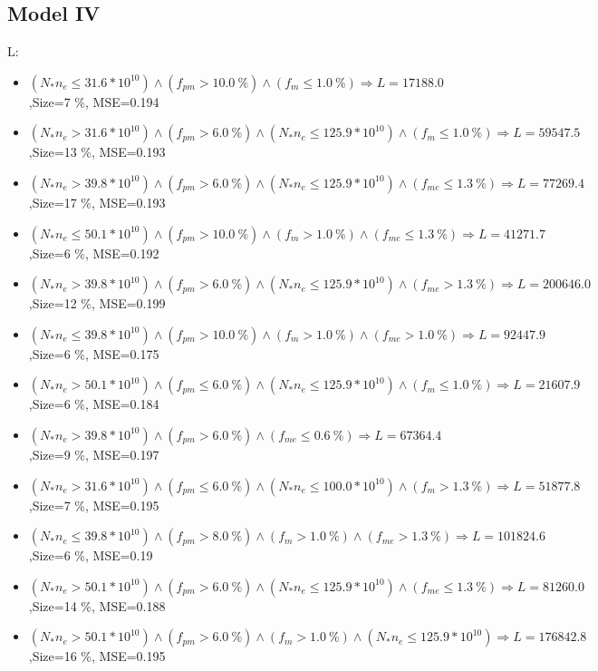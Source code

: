 \documentclass[numbered]{CSL}
\begin{document}
\subsection{Model IV}
L:
\begin{itemize}
\item $(N_* n_e \leq 31.6 * 10^{10}) \land (f_{pm} > 10.0~\%) \land (f_m \leq 1.0~\%) \Rightarrow L = 17188.0$,\hfill Size=7 \%, MSE=0.194
\item $(N_* n_e > 31.6 * 10^{10}) \land (f_{pm} > 6.0~\%) \land (N_* n_e \leq 125.9 * 10^{10}) \land (f_m \leq 1.0~\%) \Rightarrow L = 59547.5$,\hfill Size=13 \%, MSE=0.193
\item $(N_* n_e > 39.8 * 10^{10}) \land (f_{pm} > 6.0~\%) \land (N_* n_e \leq 125.9 * 10^{10}) \land (f_{me} \leq 1.3~\%) \Rightarrow L = 77269.4$,\hfill Size=17 \%, MSE=0.193
\item $(N_* n_e \leq 50.1 * 10^{10}) \land (f_{pm} > 10.0~\%) \land (f_m > 1.0~\%) \land (f_{me} \leq 1.3~\%) \Rightarrow L = 41271.7$,\hfill Size=6 \%, MSE=0.192
\item $(N_* n_e > 39.8 * 10^{10}) \land (f_{pm} > 6.0~\%) \land (N_* n_e \leq 125.9 * 10^{10}) \land (f_{me} > 1.3~\%) \Rightarrow L = 200646.0$,\hfill Size=12 \%, MSE=0.199
\item $(N_* n_e \leq 39.8 * 10^{10}) \land (f_{pm} > 10.0~\%) \land (f_m > 1.0~\%) \land (f_{me} > 1.0~\%) \Rightarrow L = 92447.9$,\hfill Size=6 \%, MSE=0.175
\item $(N_* n_e > 50.1 * 10^{10}) \land (f_{pm} \leq 6.0~\%) \land (N_* n_e \leq 125.9 * 10^{10}) \land (f_m \leq 1.0~\%) \Rightarrow L = 21607.9$,\hfill Size=6 \%, MSE=0.184
\item $(N_* n_e > 39.8 * 10^{10}) \land (f_{pm} > 6.0~\%) \land (f_{me} \leq 0.6~\%) \Rightarrow L = 67364.4$,\hfill Size=9 \%, MSE=0.197
\item $(N_* n_e > 31.6 * 10^{10}) \land (f_{pm} \leq 6.0~\%) \land (N_* n_e \leq 100.0 * 10^{10}) \land (f_m > 1.3~\%) \Rightarrow L = 51877.8$,\hfill Size=7 \%, MSE=0.195
\item $(N_* n_e \leq 39.8 * 10^{10}) \land (f_{pm} > 8.0~\%) \land (f_m > 1.0~\%) \land (f_{me} > 1.3~\%) \Rightarrow L = 101824.6$,\hfill Size=6 \%, MSE=0.19
\item $(N_* n_e > 50.1 * 10^{10}) \land (f_{pm} > 6.0~\%) \land (N_* n_e \leq 125.9 * 10^{10}) \land (f_{me} \leq 1.3~\%) \Rightarrow L = 81260.0$,\hfill Size=14 \%, MSE=0.188
\item $(N_* n_e > 50.1 * 10^{10}) \land (f_{pm} > 6.0~\%) \land (f_m > 1.0~\%) \land (N_* n_e \leq 125.9 * 10^{10}) \Rightarrow L = 176842.8$,\hfill Size=16 \%, MSE=0.195

\end{itemize}
\end{document}

